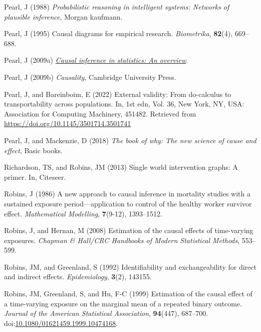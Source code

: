 \documentclass[
  singlecolumn]{article}
\newlength{\cslhangindent}
\newenvironment{CSLReferences}[2] %
 {\begin{list}{}{%
  \setlength{\itemindent}{0pt}
  \setlength{\leftmargin}{0pt}
  \setlength{\parsep}{0pt}
  \ifodd #1
   \setlength{\leftmargin}{\cslhangindent}
   \setlength{\itemindent}{-1\cslhangindent}
  \fi
  \setlength{\itemsep}{#2\baselineskip}}}
 {\end{list}}
\begin{document}
\begin{CSLReferences}{1}{0}
Pearl, J (1988) \emph{Probabilistic reasoning in intelligent systems:
Networks of plausible inference}, Morgan kaufmann.

Pearl, J (1995) Causal diagrams for empirical research.
\emph{Biometrika}, \textbf{82}(4), 669--688.

Pearl, J (2009a) \emph{\href{https://doi.org/10.1214/09-SS057}{Causal
inference in statistics: An overview}}.

Pearl, J (2009b) \emph{Causality}, Cambridge University Press.

Pearl, J, and Bareinboim, E (2022) External validity: From do-calculus
to transportability across populations. In, 1st edn, Vol. 36, New York,
NY, USA: Association for Computing Machinery, 451482. Retrieved from
\url{https://doi.org/10.1145/3501714.3501741}

Pearl, J, and Mackenzie, D (2018) \emph{The book of why: The new science
of cause and effect}, Basic books.

Richardson, TS, and Robins, JM (2013) Single world intervention graphs:
A primer. In, Citeseer.

Robins, J (1986) A new approach to causal inference in mortality studies
with a sustained exposure period---application to control of the healthy
worker survivor effect. \emph{Mathematical Modelling}, \textbf{7}(9-12),
1393--1512.

Robins, J, and Hernan, M (2008) Estimation of the causal effects of
time-varying exposures. \emph{Chapman \& Hall/CRC Handbooks of Modern
Statistical Methods}, 553--599.

Robins, JM, and Greenland, S (1992) Identifiability and exchangeability
for direct and indirect effects. \emph{Epidemiology}, \textbf{3}(2),
143155.

Robins, JM, Greenland, S, and Hu, F-C (1999) Estimation of the causal
effect of a time-varying exposure on the marginal mean of a repeated
binary outcome. \emph{Journal of the American Statistical Association},
\textbf{94}(447), 687--700.
doi:\href{https://doi.org/10.1080/01621459.1999.10474168}{10.1080/01621459.1999.10474168}.


\end{CSLReferences}
\end{document}
